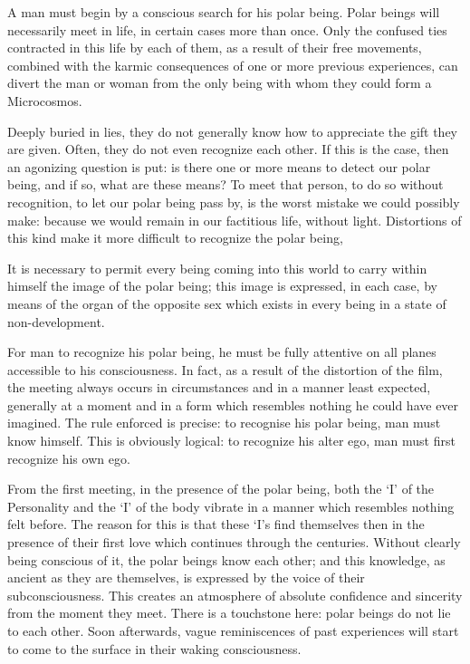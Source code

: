 \begin{quotationx}
A man must begin by a conscious search for his polar being. Polar beings will necessarily meet in life, in certain cases more than once. Only the confused ties contracted in this life by each of them, as a result of their free movements, combined with the karmic consequences of one or more previous experiences, can divert the man or woman from the only being with whom they could form a Microcosmos.

Deeply buried in lies, they do not generally know how to appreciate the gift they are given. Often, they do not even recognize each other. If this is the case, then an agonizing question is put: is there one or more means to detect our polar being, and if so, what are these means? To meet that person, to do so without recognition, to let our polar being pass by, is the worst mistake we could possibly make: because we would remain in our factitious life, without light. Distortions of this kind make it more difficult to recognize the polar being,

It is necessary to permit every being coming into this world to carry within himself the image of the polar being; this image is expressed, in each case, by means of the organ of the opposite sex which exists in every being in a state of non-development.

For man to recognize his polar being, he must be fully attentive on all planes accessible to his consciousness. In fact, as a result of the distortion of the film, the meeting always occurs in circumstances and in a manner least expected, generally at a moment and in a form which resembles nothing he could have ever imagined. The rule enforced is precise: to recognise his polar being, man must know himself. This is obviously logical: to recognize his alter ego, man must first recognize his own ego.

From the first meeting, in the presence of the polar being, both the `I' of the Personality and the `I' of the body vibrate in a manner which resembles nothing felt before. The reason for this is that these `I's find themselves then in the presence of their first love which continues through the centuries. Without clearly being conscious of it, the polar beings know each other; and this knowledge, as ancient as they are themselves, is expressed by the voice of their subconsciousness. This creates an atmosphere of absolute confidence and sincerity from the moment they meet. There is a touchstone here: polar beings do not lie to each other. Soon afterwards, vague reminiscences of past experiences will start to come to the surface in their waking consciousness.


\end{quotationx}

